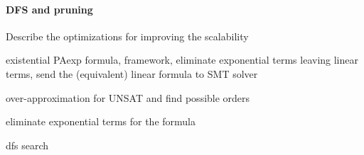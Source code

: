 \paragraph{DFS and pruning}




Describe the optimizations for improving the scalability

existential PAexp formula, framework, eliminate exponential terms leaving linear terms, send the (equivalent) linear formula to SMT solver

over-approximation for UNSAT and find possible orders

eliminate exponential terms for the formula

dfs search



